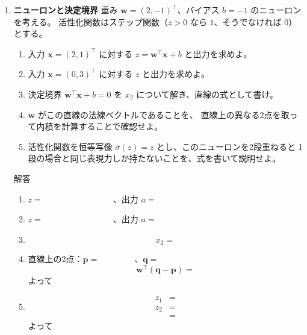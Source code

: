 \documentclass[a4paper,dvipdfmx]{jsarticle}
\newcommand{\学籍番号}{0000000}
\newcommand{\氏名}{氏名を書く}
\newcommand{\提出日}{2026年10月8日}
\newenvironment{answer}{\begin{itembox}[l]{解答}}{\end{itembox}}
\begin{document}
\begin{enumerate}
  \item \textbf{ニューロンと決定境界}\quad
    重み $\bm{w} = (2, -1)^\top$、バイアス $b = -1$ のニューロンを考える。
    活性化関数はステップ関数（$z > 0$ なら $1$、そうでなければ $0$）とする。
    \begin{enumerate}
      \item 入力 $\bm{x} = (2, 1)^\top$ に対する $z = \bm{w}^\top \bm{x} + b$ と出力を求めよ。
      \item 入力 $\bm{x} = (0, 3)^\top$ に対する $z$ と出力を求めよ。
      \item 決定境界 $\bm{w}^\top \bm{x} + b = 0$ を $x_2$ について解き、直線の式として書け。
      \item $\bm{w}$ がこの直線の法線ベクトルであることを、
        直線上の異なる2点を取って内積を計算することで確認せよ。
      \item 活性化関数を恒等写像 $\sigma(z) = z$ とし、このニューロンを2段重ねると
        1段の場合と同じ表現力しか持たないことを、式を書いて説明せよ。
    \end{enumerate}
    \begin{answer}
      \begin{enumerate}
        \item $z = \phantom{XXXXXXXXXX}$、出力 $a = \phantom{XXX}$
        \item $z = \phantom{XXXXXXXXXX}$、出力 $a = \phantom{XXX}$
        \item
          \begin{equation*}
            x_2 =
          \end{equation*}
        \item 直線上の2点：$\bm{p} = \phantom{XXXXX}$、$\bm{q} = \phantom{XXXXX}$
          \begin{equation*}
            \bm{w}^\top (\bm{q} - \bm{p}) =
          \end{equation*}
          よって
        \item
          \begin{align*}
            z_1 &= \\
            z_2 &= \\
                &=
          \end{align*}
          よって
      \end{enumerate}
    \end{answer}


\end{enumerate}
\end{document}
